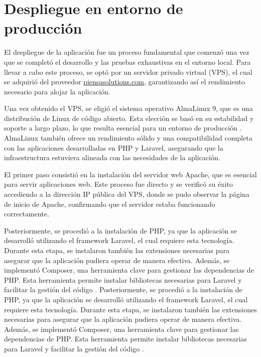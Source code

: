 \section{Despliegue en entorno de producción}\label{sec:apartado}

El despliegue de la aplicación fue un proceso fundamental que comenzó una vez que se completó el desarrollo y las pruebas exhaustivas en el entorno local. Para llevar a cabo este proceso, se optó por un servidor privado virtual (VPS), el cual se adquirió del proveedor \href{https://piensasolutions.com}{piensasolutions.com}, garantizando así el rendimiento necesario para alojar la aplicación.

\vspace{0.5cm}

Una vez obtenido el VPS, se eligió el sistema operativo AlmaLinux 9, que es una distribución de Linux de código abierto. Esta elección se basó en su estabilidad y soporte a largo plazo, lo que resulta esencial para un entorno de producción \cite{almalinux2021}. AlmaLinux también ofrece un rendimiento sólido y una compatibilidad completa con las aplicaciones desarrolladas en PHP y Laravel, asegurando que la infraestructura estuviera alineada con las necesidades de la aplicación.


\vspace{0.5cm}

El primer paso consistió en la instalación del servidor web Apache, que es esencial para servir aplicaciones web. Este proceso fue directo y se verificó su éxito accediendo a la dirección IP pública del VPS, donde se pudo observar la página de inicio de Apache, confirmando que el servidor estaba funcionando correctamente.

\vspace{0.5cm}

Posteriormente, se procedió a la instalación de PHP, ya que la aplicación se desarrolló utilizando el framework Laravel, el cual requiere esta tecnología. Durante esta etapa, se instalaron también las extensiones necesarias para asegurar que la aplicación pudiera operar de manera efectiva. Además, se implementó Composer, una herramienta clave para gestionar las dependencias de PHP. Esta herramienta permite instalar bibliotecas necesarias para Laravel y facilitar la gestión del código  \cite{composer2021}.
Posteriormente, se procedió a la instalación de PHP, ya que la aplicación se desarrolló utilizando el framework Laravel, el cual requiere esta tecnología. Durante esta etapa, se instalaron también las extensiones necesarias para asegurar que la aplicación pudiera operar de manera efectiva. Además, se implementó Composer, una herramienta clave para gestionar las dependencias de PHP. Esta herramienta permite instalar bibliotecas necesarias para Laravel y facilitar la gestión del código  \cite{composer2021}.

